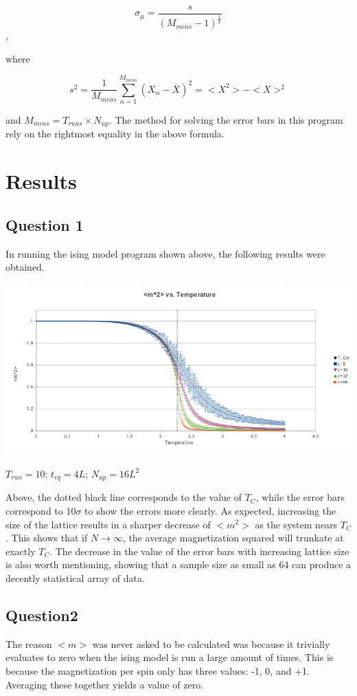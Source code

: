 \documentclass[10pt]{article}
\begin{document}
$$\sigma_\mu = \frac{s}{(M_{meas}-1)^\frac{1}{2}}$$,

where

$$s^2 = \frac{1}{M_{meas}} \sum\limits_{\alpha = 1}^{M_{meas}} \left(X_\alpha - \overline{X}\right)^2 = <X^2> - <X>^2$$

and $M_{meas} = T_{runs} \times N_{up}$. The method for solving the error bars in this program rely on the rightmost equality in the above formula. 

\section{Results}
\subsection*{Question 1}
In running the ising model program shown above, the following results were obtained.

\begin{center}
\includegraphics[scale=0.6]{msqvstemp}

\footnotesize $T_{run} = 10$; $t_{eq} = 4L$; $N_{up} = 16L^2$
\end{center}
Above, the dotted black line corresponds to the value of $T_C$, while the error bars correspond to 10$\sigma$ to show the errors more clearly. As expected, increasing the size of the lattice results in a sharper decrease of $<m^2>$ as the system nears $T_C$. This shows that if $N \to \infty$, the average magnetization squared will trunkate at exactly $T_C$. The decrease in the value of the error bars with increasing lattice size is also worth mentioning, showing that a sample size as small as 64 can produce a decently statistical array of data. 

\subsection*{Question2}
The reason $<m>$ was never asked to be calculated was because it trivially evaluates to zero when the ising model is run a large amount of times. This is because the magnetization per spin only has three values: -1, 0, and +1. Averaging these together yields a value of zero.
\end{document}

